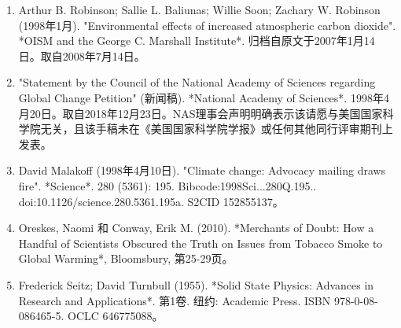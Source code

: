 \begin{enumerate}
\item Arthur B. Robinson; Sallie L. Baliunas; Willie Soon; Zachary W. Robinson (1998年1月). "Environmental effects of increased atmospheric carbon dioxide". *OISM and the George C. Marshall Institute*. 归档自原文于2007年1月14日。取自2008年7月14日。
\item "Statement by the Council of the National Academy of Sciences regarding Global Change Petition" (新闻稿). *National Academy of Sciences*. 1998年4月20日。取自2018年12月23日。NAS理事会声明明确表示该请愿与美国国家科学院无关，且该手稿未在《美国国家科学院学报》或任何其他同行评审期刊上发表。
\item David Malakoff (1998年4月10日). "Climate change: Advocacy mailing draws fire". *Science*. 280 (5361): 195. Bibcode:1998Sci...280Q.195.. doi:10.1126/science.280.5361.195a. S2CID 152855137。
\item Oreskes, Naomi 和 Conway, Erik M. (2010). *Merchants of Doubt: How a Handful of Scientists Obscured the Truth on Issues from Tobacco Smoke to Global Warming*, Bloomsbury, 第25-29页。
\item Frederick Seitz; David Turnbull (1955). *Solid State Physics: Advances in Research and Applications*. 第1卷. 纽约: Academic Press. ISBN 978-0-08-086465-5. OCLC 646775088。
\end{enumerate}